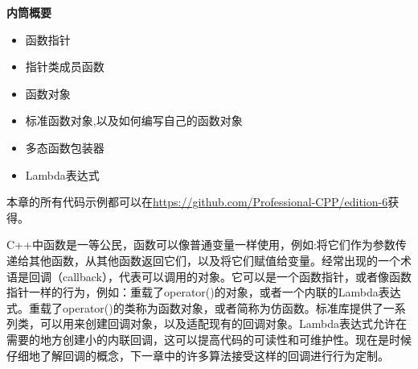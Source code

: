 \noindent
\textbf{内筒概要}

\begin{itemize}
\item
函数指针

\item
指针类成员函数

\item
函数对象

\item
标准函数对象,以及如何编写自己的函数对象

\item
多态函数包装器

\item
Lambda表达式
\end{itemize}

本章的所有代码示例都可以在\url{https://github.com/Professional-CPP/edition-6}获得。

C++中函数是一等公民，函数可以像普通变量一样使用，例如:将它们作为参数传递给其他函数，从其他函数返回它们，以及将它们赋值给变量。经常出现的一个术语是回调（callback），代表可以调用的对象。它可以是一个函数指针，或者像函数指针一样的行为，例如：重载了operator()的对象，或者一个内联的Lambda表达式。重载了operator()的类称为函数对象，或者简称为仿函数。标准库提供了一系列类，可以用来创建回调对象，以及适配现有的回调对象。Lambda表达式允许在需要的地方创建小的内联回调，这可以提高代码的可读性和可维护性。现在是时候仔细地了解回调的概念，下一章中的许多算法接受这样的回调进行行为定制。
